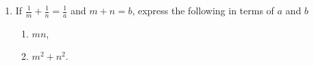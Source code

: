 \documentclass[11pt]{article}
\begin{document}
\begin{enumerate}
        \hrulefill

            \hrulefill
            
            \hrulefill
            
            \hrulefill
            
            \hrulefill
            
            \hrulefill
            
            \hrulefill
            
            \hrulefill
            
            \hrulefill
            
            \hrulefill
            
            \hrulefill
            
            \hrulefill

            \hrulefill

            \hrulefill
            
            \hrulefill
            
            \hrulefill
            
            \hrulefill
            
            \hrulefill
            
            \hrulefill
            
            \hrulefill
            
            \hrulefill
            
            \hrulefill
            
            \hrulefill
            
            \hrulefill

        \pagebreak
        \item If $\displaystyle \frac{1}{m}+\frac{1}{n}=\frac{1}{a}$ and $m+n=b$, express the following in terms of $a$ and $b$\begin{enumerate}
            \item $mn$,
            \item $m^2+n^2$.
        \end{enumerate}

        \hrulefill

            \hrulefill
            
            \hrulefill
            
            \hrulefill
            
            \hrulefill
            

\end{enumerate}
\end{document}
